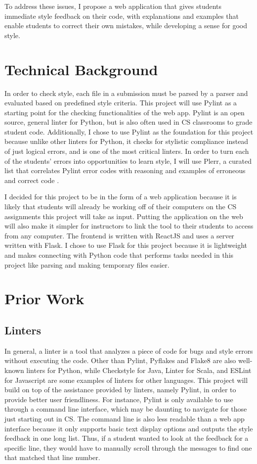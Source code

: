 \documentclass[10pt,twocolumn]{article}
\begin{document}
To address these issues, I propose a web application that gives students immediate style feedback on their code, with explanations and examples that enable students to correct their own mistakes, while developing a sense for good style. 

\section{Technical Background}
In order to check style, each file in a submission must be parsed by a parser and evaluated based on predefined style criteria. 
This project will use Pylint as a starting point for the checking functionalities of the web app. 
Pylint is an open source, general linter for Python, but is also often used in CS classrooms to grade student code. 
Additionally, I chose to use Pylint as the foundation for this project because unlike other linters for Python, it checks for stylistic compliance instead of just logical errors, and is one of the most critical linters.
In order to turn each of the students' errors into opportunities to learn style, I will use Plerr, a curated list that correlates Pylint error codes with reasoning and examples of erroneous and correct code \cite{plerr}. 

I decided for this project to be in the form of a web application because it is likely that students will already be working off of their computers on the CS assignments this project will take as input. 
Putting the application on the web will also make it simpler for instructors to link the tool to their students to access from any computer. 
The frontend is written with ReactJS and uses a server written with Flask. 
I chose to use Flask for this project because it is lightweight and makes connecting with Python code that performs tasks needed in this project like parsing and making temporary files easier. 

\section{Prior Work}
\subsection{Linters}
In general, a linter is a tool that analyzes a piece of code for bugs and style errors without executing the code.
Other than Pylint, Pyflakes and Flake8 are also well-known linters for Python, while Checkstyle for Java, Linter for Scala, and ESLint for Javascript are some examples of linters for other languages. 
This project will build on top of the assistance provided by linters, namely Pylint, in order to provide better user friendliness.
For instance, Pylint is only available to use through a command line interface, which may be daunting to navigate for those just starting out in CS.
The command line is also less readable than a web app interface because it only supports basic text display options and outputs the style feedback in one long list.
Thus, if a student wanted to look at the feedback for a specific line, they would have to manually scroll through the messages to find one that matched that line number. 
\end{document}
